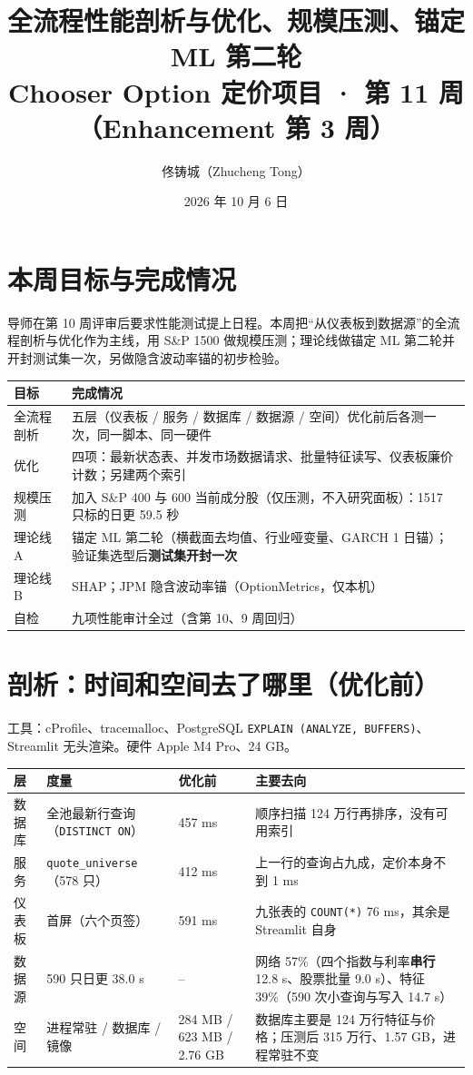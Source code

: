 \documentclass[11pt]{ctexart}
\title{\textbf{全流程性能剖析与优化、规模压测、锚定 ML 第二轮}\\
\large Chooser Option 定价项目 · 第 11 周（Enhancement 第 3 周）}
\author{佟铸城（Zhucheng Tong）}
\date{2026 年 10 月 6 日}
\begin{document}
\maketitle

\section{本周目标与完成情况}

导师在第 10 周评审后要求性能测试提上日程。本周把“从仪表板到数据源”的全流程剖析与优化作为主线，用 S\&P 1500 做规模压测；理论线做锚定 ML 第二轮并开封测试集一次，另做隐含波动率锚的初步检验。

\begin{center}\small
\begin{tabular}{p{4.0cm}p{11.0cm}}
\toprule
目标 & 完成情况 \\
\midrule
全流程剖析 & 五层（仪表板 / 服务 / 数据库 / 数据源 / 空间）优化前后各测一次，同一脚本、同一硬件 \\
优化 & 四项：最新状态表、并发市场数据请求、批量特征读写、仪表板廉价计数；另建两个索引 \\
规模压测 & 加入 S\&P 400 与 600 当前成分股（仅压测，不入研究面板）：1517 只标的日更 59.5 秒 \\
理论线 A & 锚定 ML 第二轮（横截面去均值、行业哑变量、GARCH 1 日锚）；验证集选型后\textbf{测试集开封一次} \\
理论线 B & SHAP；JPM 隐含波动率锚（OptionMetrics，仅本机） \\
自检 & 九项性能审计全过（含第 10、9 周回归） \\
\bottomrule
\end{tabular}
\end{center}

\section{剖析：时间和空间去了哪里（优化前）}

工具：cProfile、tracemalloc、PostgreSQL \texttt{EXPLAIN (ANALYZE, BUFFERS)}、Streamlit 无头渲染。硬件 Apple M4 Pro、24 GB。

\begin{center}\small
\begin{tabular}{p{1.5cm}p{4.4cm}p{3.0cm}p{5.9cm}}
\toprule
层 & 度量 & 优化前 & 主要去向 \\
\midrule
数据库 & 全池最新行查询（\texttt{DISTINCT ON}） & 457 ms & 顺序扫描 124 万行再排序，没有可用索引 \\
服务 & \texttt{quote\_universe}（578 只） & 412 ms & 上一行的查询占九成，定价本身不到 1 ms \\
仪表板 & 首屏（六个页签） & 591 ms & 九张表的 \texttt{COUNT(*)} 76 ms，其余是 Streamlit 自身 \\
数据源 & 590 只日更 38.0 s & -- & 网络 57\%（四个指数与利率\textbf{串行} 12.8 s、股票批量 9.0 s）、特征 39\%（590 次小查询与写入 14.7 s） \\
空间 & 进程常驻 / 数据库 / 镜像 & 284 MB / 623 MB / 2.76 GB & 数据库主要是 124 万行特征与价格；压测后 315 万行、1.57 GB，进程常驻不变 \\
\bottomrule
\end{tabular}
\end{center}
\end{document}
